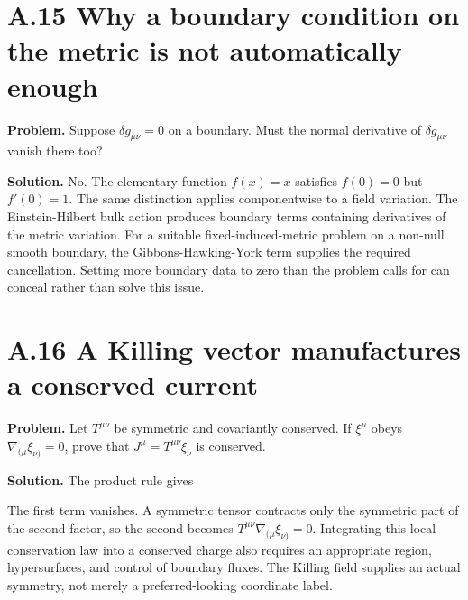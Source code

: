 \documentclass[
  11pt,
  letterpaper,
  oneside,
  openany]{scrbook}
\begin{document}
\hypertarget{a.15-why-a-boundary-condition-on-the-metric-is-not-automatically-enough}{%
\section{A.15 Why a boundary condition on the metric is not
automatically
enough}\label{a.15-why-a-boundary-condition-on-the-metric-is-not-automatically-enough}}

\textbf{Problem.} Suppose \(\delta g_{\mu\nu}=0\) on a boundary. Must
the normal derivative of \(\delta g_{\mu\nu}\) vanish there too?

\textbf{Solution.} No. The elementary function \(f(x)=x\) satisfies
\(f(0)=0\) but \(f'(0)=1\). The same distinction applies componentwise
to a field variation. The Einstein-Hilbert bulk action produces boundary
terms containing derivatives of the metric variation. For a suitable
fixed-induced-metric problem on a non-null smooth boundary, the
Gibbons-Hawking-York term supplies the required cancellation. Setting
more boundary data to zero than the problem calls for can conceal rather
than solve this issue.

\hypertarget{a.16-a-killing-vector-manufactures-a-conserved-current}{%
\section{A.16 A Killing vector manufactures a conserved
current}\label{a.16-a-killing-vector-manufactures-a-conserved-current}}

\textbf{Problem.} Let \(T^{\mu\nu}\) be symmetric and covariantly
conserved. If \(\xi^\mu\) obeys \(\nabla_{(\mu}\xi_{\nu)}=0\), prove
that \(J^\mu=T^{\mu\nu}\xi_\nu\) is conserved.

\textbf{Solution.} The product rule gives

\begin{center}
\begingroup
{}
\ifdim\wd\grmathbox>\linewidth
\resizebox{\linewidth}{!}{\usebox{\grmathbox}}
\else\usebox{\grmathbox}\fi
\endgroup
\end{center}

The first term vanishes. A symmetric tensor contracts only the symmetric
part of the second factor, so the second becomes
\(T^{\mu\nu}\nabla_{(\mu}\xi_{\nu)}=0\). Integrating this local
conservation law into a conserved charge also requires an appropriate
region, hypersurfaces, and control of boundary fluxes. The Killing field
supplies an actual symmetry, not merely a preferred-looking coordinate
label.
\end{document}

